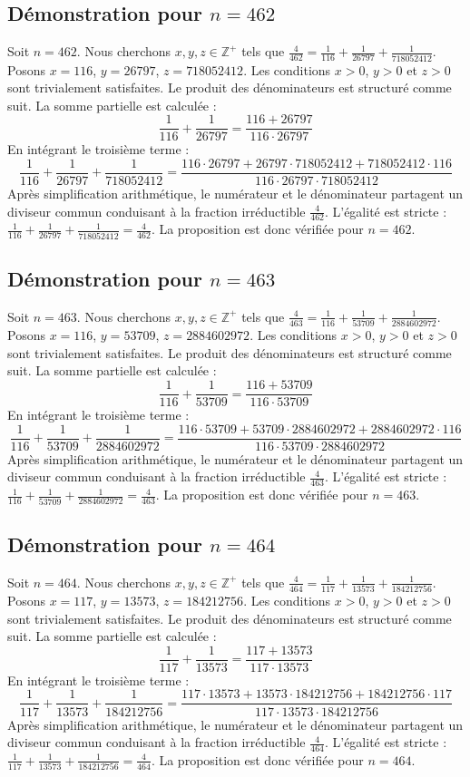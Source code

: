 \documentclass[11pt,a4paper]{article}
\begin{document}
\subsection{Démonstration pour $n = 462$}
Soit $n = 462$. Nous cherchons $x, y, z \in \mathbb{Z}^{+}$ tels que $\frac{4}{462} = \frac{1}{116} + \frac{1}{26797} + \frac{1}{718052412}$.
Posons $x = 116$, $y = 26797$, $z = 718052412$.
Les conditions $x > 0$, $y > 0$ et $z > 0$ sont trivialement satisfaites.
Le produit des dénominateurs est structuré comme suit. La somme partielle est calculée :
$$ \frac{1}{116} + \frac{1}{26797} = \frac{116+26797}{116 \cdot 26797} $$
En intégrant le troisième terme :
$$ \frac{1}{116} + \frac{1}{26797} + \frac{1}{718052412} = \frac{116 \cdot 26797 + 26797 \cdot 718052412 + 718052412 \cdot 116}{116 \cdot 26797 \cdot 718052412} $$
Après simplification arithmétique, le numérateur et le dénominateur partagent un diviseur commun conduisant à la fraction irréductible $\frac{4}{462}$.
L'égalité est stricte : $\frac{1}{116} + \frac{1}{26797} + \frac{1}{718052412} = \frac{4}{462}$.
La proposition est donc vérifiée pour $n = 462$.
\subsection{Démonstration pour $n = 463$}
Soit $n = 463$. Nous cherchons $x, y, z \in \mathbb{Z}^{+}$ tels que $\frac{4}{463} = \frac{1}{116} + \frac{1}{53709} + \frac{1}{2884602972}$.
Posons $x = 116$, $y = 53709$, $z = 2884602972$.
Les conditions $x > 0$, $y > 0$ et $z > 0$ sont trivialement satisfaites.
Le produit des dénominateurs est structuré comme suit. La somme partielle est calculée :
$$ \frac{1}{116} + \frac{1}{53709} = \frac{116+53709}{116 \cdot 53709} $$
En intégrant le troisième terme :
$$ \frac{1}{116} + \frac{1}{53709} + \frac{1}{2884602972} = \frac{116 \cdot 53709 + 53709 \cdot 2884602972 + 2884602972 \cdot 116}{116 \cdot 53709 \cdot 2884602972} $$
Après simplification arithmétique, le numérateur et le dénominateur partagent un diviseur commun conduisant à la fraction irréductible $\frac{4}{463}$.
L'égalité est stricte : $\frac{1}{116} + \frac{1}{53709} + \frac{1}{2884602972} = \frac{4}{463}$.
La proposition est donc vérifiée pour $n = 463$.
\subsection{Démonstration pour $n = 464$}
Soit $n = 464$. Nous cherchons $x, y, z \in \mathbb{Z}^{+}$ tels que $\frac{4}{464} = \frac{1}{117} + \frac{1}{13573} + \frac{1}{184212756}$.
Posons $x = 117$, $y = 13573$, $z = 184212756$.
Les conditions $x > 0$, $y > 0$ et $z > 0$ sont trivialement satisfaites.
Le produit des dénominateurs est structuré comme suit. La somme partielle est calculée :
$$ \frac{1}{117} + \frac{1}{13573} = \frac{117+13573}{117 \cdot 13573} $$
En intégrant le troisième terme :
$$ \frac{1}{117} + \frac{1}{13573} + \frac{1}{184212756} = \frac{117 \cdot 13573 + 13573 \cdot 184212756 + 184212756 \cdot 117}{117 \cdot 13573 \cdot 184212756} $$
Après simplification arithmétique, le numérateur et le dénominateur partagent un diviseur commun conduisant à la fraction irréductible $\frac{4}{464}$.
L'égalité est stricte : $\frac{1}{117} + \frac{1}{13573} + \frac{1}{184212756} = \frac{4}{464}$.
La proposition est donc vérifiée pour $n = 464$.
\end{document}
